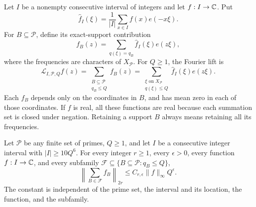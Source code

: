 Let \(I\) be a nonempty consecutive interval of integers and let
\(f:I\to\mathbb C\).  Put
\[
 \widehat f_I(\xi)=\frac1{|I|}\sum_{x\in I}f(x)e(-x\xi).
\]
For \(B\subseteq\mathcal P\), define its exact-support contribution
\[
 f_B(z)=\sum_{q(\xi)=q_B}\widehat f_I(\xi)e(z\xi),
\]
where the frequencies are characters of \(X_{\mathcal P}\).  For
\(Q\ge1\), the Fourier lift is
\[
 \mathcal L_{I,\mathcal P,Q}f(z)
 =\sum_{\substack{B\subseteq\mathcal P\\q_B\le Q}}f_B(z)
 =\sum_{\substack{\xi\text{ on }X_{\mathcal P}\\q(\xi)\le Q}}
                   \widehat f_I(\xi)e(z\xi).
\]
Each \(f_B\) depends only on the coordinates in \(B\), and has mean
zero in each of those coordinates.  If \(f\) is real, all these
functions are real because each summation set is closed under negation.
Retaining a support \(B\) always means retaining all its frequencies.

\begin{proposition}
\label{prop:lift-moments}
Let \(\mathcal P\) be any finite set of primes, \(Q\ge1\), and let
\(I\) be a consecutive integer interval with \(|I|\ge10Q^6\).
For every integer \(r\ge1\), every \(\epsilon>0\), every function
\(f:I\to\mathbb C\), and every subfamily
\(\mathcal F\subseteq\{B\subseteq\mathcal P:q_B\le Q\}\),
\begin{equation}
 \left\|\sum_{B\in\mathcal F}f_B\right\|_{2r}
 \le C_{r,\epsilon}\|f\|_\infty Q^\epsilon.
 \label{eq:lift-moments}
\end{equation}
The constant is independent of the prime set, the interval and its
location, the function, and the subfamily.
\end{proposition}

